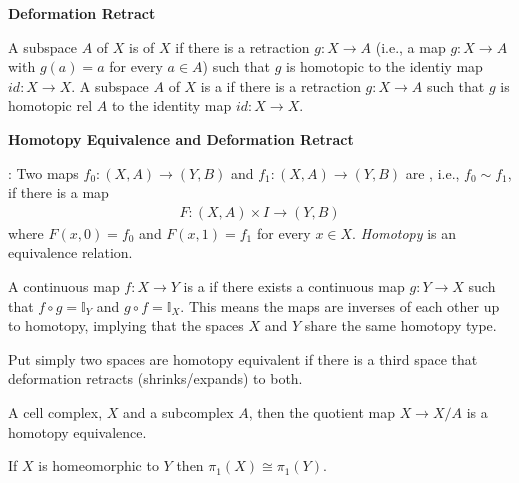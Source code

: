 \documentclass[12pt,a4paper]{report}
\begin{document}
\begin{description}
	\item \textbf{Deformation Retract}
	
	\begin{definition}
	A subspace $A$ of $X$ is  of $X$ if there is a retraction $g:X \to A$ (i.e., a map $g: X\to A$ with $g(a)=a$ for every $a\in A$)  such that $g$ is homotopic to the identiy map $id: X \to X$.  A subspace $A$ of $X$ is a  if there is a retraction $g: X \to A$ such that $g$ is homotopic rel $A$ to the identity map $id: X \to X$.
	
	\end{definition}
		
	\item \textbf{Homotopy Equivalence and Deformation Retract}
	
	: Two maps $f_0:(X,A) \to (Y,B)$ and $f_1:(X,A) \to (Y,B)$ are , i.e., $f_0 \sim f_1$, if there is a map 
	\begin{align*}
		F: (X,A)\times I \to (Y,B)
	\end{align*}where $F(x,0) = f_0$ and $F(x,1) = f_1$ for every $x\in X$.  \textit{Homotopy} is an equivalence relation.

	\begin{definition} A continuous map $f: X \to Y$ is a  if there exists a continuous map $g:Y \to X$ such that $f \circ g = \mathbb{I}_Y$  and $g \circ f = \mathbb{I}_X$. This means the maps are inverses of each other up to homotopy, implying that the spaces $X$ and $Y$ share the same homotopy type.
	\end{definition}
	
	\begin{theorem}
		 Put simply two spaces are homotopy equivalent if there is a third space that deformation retracts (shrinks/expands) to both.
\end{theorem}
	
	\begin{lemma} A cell complex, $X$ and a subcomplex $A$, then the quotient map $X \to X/A$ is a homotopy equivalence.
	\end{lemma}
	
	\begin{theorem} If $X$ is homeomorphic to $Y$ then $\pi_1(X) \cong \pi_1(Y)$.
	\end{theorem}
	
	\begin{theorem}
	

\end{theorem}
\end{description}
\end{document}
